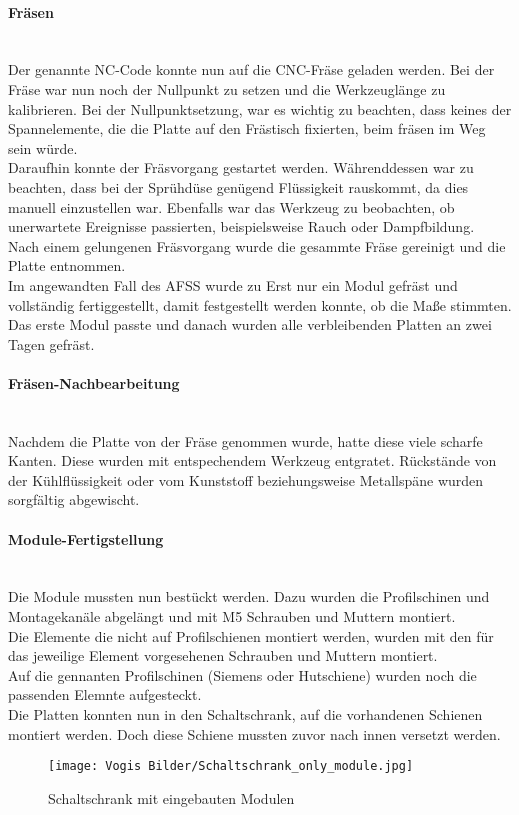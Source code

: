     \paragraph{Fräsen}\mbox{}\\
    Der genannte NC-Code konnte nun auf die CNC-Fräse geladen werden. Bei der Fräse war nun noch der Nullpunkt zu setzen und die Werkzeuglänge zu kalibrieren. Bei der Nullpunktsetzung, war es wichtig zu beachten, dass keines der Spannelemente, die die Platte auf den Frästisch fixierten, beim fräsen im Weg sein würde.\\
    Daraufhin konnte der Fräsvorgang gestartet werden. Währenddessen war zu beachten, dass bei der Sprühdüse genügend Flüssigkeit rauskommt, da dies manuell einzustellen war. Ebenfalls war das Werkzeug zu beobachten, ob unerwartete Ereignisse passierten, beispielsweise Rauch oder Dampfbildung.\\ 
    Nach einem gelungenen Fräsvorgang wurde die gesammte Fräse gereinigt und die Platte entnommen.\\
    Im angewandten Fall des AFSS wurde zu Erst nur ein Modul gefräst und vollständig fertiggestellt, damit festgestellt werden konnte, ob die Maße stimmten. Das erste Modul passte und danach wurden alle verbleibenden Platten an zwei Tagen gefräst.

    \paragraph{Fräsen-Nachbearbeitung}\mbox{}\\
    Nachdem die Platte von der Fräse genommen wurde, hatte diese viele scharfe Kanten. Diese wurden mit entspechendem Werkzeug entgratet. Rückstände von der Kühlflüssigkeit oder vom Kunststoff beziehungsweise Metallspäne wurden sorgfältig abgewischt.
    \paragraph{Module-Fertigstellung}\mbox{}\\
    Die Module mussten nun bestückt werden. Dazu wurden die Profilschinen und Montagekanäle abgelängt und mit M5 Schrauben und Muttern montiert.\\
    Die Elemente die nicht auf Profilschienen montiert werden, wurden mit den für das jeweilige Element vorgesehenen Schrauben und Muttern montiert.\\
    Auf die gennanten Profilschinen (Siemens oder Hutschiene) wurden noch die passenden Elemnte aufgesteckt.\\
    Die Platten konnten nun in den Schaltschrank, auf die vorhandenen Schienen montiert werden. Doch diese Schiene mussten zuvor nach innen versetzt werden. 
    \begin{figure}[h]
        \centering
        \texttt{[image: Vogis Bilder/Schaltschrank\_only\_module.jpg]}
        \caption{Schaltschrank mit eingebauten Modulen}
        \label{fig:Schaltschrank_onlyModule}
    \end{figure}    
